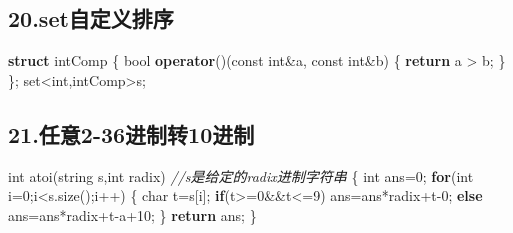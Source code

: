 \documentclass[
]{article}
\newenvironment{Shaded}{}{}
\newcommand{\AttributeTok}[1]{\textcolor[rgb]{0.49,0.56,0.16}{#1}}
\newcommand{\CharTok}[1]{\textcolor[rgb]{0.25,0.44,0.63}{#1}}
\newcommand{\CommentTok}[1]{\textcolor[rgb]{0.38,0.63,0.69}{\textit{#1}}}
\newcommand{\ControlFlowTok}[1]{\textcolor[rgb]{0.00,0.44,0.13}{\textbf{#1}}}
\newcommand{\DataTypeTok}[1]{\textcolor[rgb]{0.56,0.13,0.00}{#1}}
\newcommand{\DecValTok}[1]{\textcolor[rgb]{0.25,0.63,0.44}{#1}}
\newcommand{\KeywordTok}[1]{\textcolor[rgb]{0.00,0.44,0.13}{\textbf{#1}}}
\newcommand{\NormalTok}[1]{#1}
\newcommand{\OperatorTok}[1]{\textcolor[rgb]{0.40,0.40,0.40}{#1}}
\begin{document}
\hypertarget{20setux81eaux5b9aux4e49ux6392ux5e8f}{%
\subsection{20.set自定义排序}\label{20setux81eaux5b9aux4e49ux6392ux5e8f}}

\begin{Shaded}
\begin{Highlighting}[]
\KeywordTok{struct}\NormalTok{ intComp}
\OperatorTok{\{}
    \DataTypeTok{bool} \KeywordTok{operator}\OperatorTok{()(}\AttributeTok{const} \DataTypeTok{int}\OperatorTok{\&}\NormalTok{a}\OperatorTok{,} \AttributeTok{const} \DataTypeTok{int}\OperatorTok{\&}\NormalTok{b}\OperatorTok{)}
    \OperatorTok{\{}
        \ControlFlowTok{return}\NormalTok{ a }\OperatorTok{\textgreater{}}\NormalTok{ b}\OperatorTok{;}
    \OperatorTok{\}}
\OperatorTok{\};}
\NormalTok{set}\OperatorTok{\textless{}}\DataTypeTok{int}\OperatorTok{,}\NormalTok{intComp}\OperatorTok{\textgreater{}}\NormalTok{s}\OperatorTok{;}
\end{Highlighting}
\end{Shaded}

\hypertarget{21ux4efbux610f2-36ux8fdbux5236ux8f6c10ux8fdbux5236}{%
\subsection{21.任意2-36进制转10进制}\label{21ux4efbux610f2-36ux8fdbux5236ux8f6c10ux8fdbux5236}}

\begin{Shaded}
\begin{Highlighting}[]
\DataTypeTok{int}\NormalTok{ atoi}\OperatorTok{(}\NormalTok{string s}\OperatorTok{,}\DataTypeTok{int}\NormalTok{ radix}\OperatorTok{)}    \CommentTok{//s是给定的radix进制字符串}
\OperatorTok{\{}
	\DataTypeTok{int}\NormalTok{ ans}\OperatorTok{=}\DecValTok{0}\OperatorTok{;}
	\ControlFlowTok{for}\OperatorTok{(}\DataTypeTok{int}\NormalTok{ i}\OperatorTok{=}\DecValTok{0}\OperatorTok{;}\NormalTok{i}\OperatorTok{\textless{}}\NormalTok{s}\OperatorTok{.}\NormalTok{size}\OperatorTok{();}\NormalTok{i}\OperatorTok{++)}
	\OperatorTok{\{}
		\DataTypeTok{char}\NormalTok{ t}\OperatorTok{=}\NormalTok{s}\OperatorTok{[}\NormalTok{i}\OperatorTok{];}
		\ControlFlowTok{if}\OperatorTok{(}\NormalTok{t}\OperatorTok{\textgreater{}=}\CharTok{\textquotesingle{}0\textquotesingle{}}\OperatorTok{\&\&}\NormalTok{t}\OperatorTok{\textless{}=}\CharTok{\textquotesingle{}9\textquotesingle{}}\OperatorTok{)}\NormalTok{ ans}\OperatorTok{=}\NormalTok{ans}\OperatorTok{*}\NormalTok{radix}\OperatorTok{+}\NormalTok{t}\OperatorTok{{-}}\CharTok{\textquotesingle{}0\textquotesingle{}}\OperatorTok{;}
		\ControlFlowTok{else}\NormalTok{ ans}\OperatorTok{=}\NormalTok{ans}\OperatorTok{*}\NormalTok{radix}\OperatorTok{+}\NormalTok{t}\OperatorTok{{-}}\CharTok{\textquotesingle{}a\textquotesingle{}}\OperatorTok{+}\DecValTok{10}\OperatorTok{;}
	\OperatorTok{\}}
    \ControlFlowTok{return}\NormalTok{ ans}\OperatorTok{;}
\OperatorTok{\}}
\end{Highlighting}
\end{Shaded}
\end{document}
